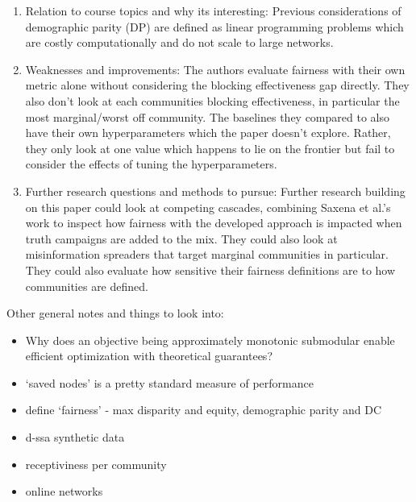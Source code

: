 \documentclass[11pt]{article}
\begin{document}
\begin{enumerate}
    \item Relation to course topics and why its interesting: Previous considerations of demographic parity (DP) are defined as linear programming problems which are costly computationally and do not scale to large networks.

    \item Weaknesses and improvements: The authors evaluate fairness with their own metric alone without considering the blocking effectiveness gap directly. They also don't look at each communities blocking effectiveness, in particular the most marginal/worst off community. The baselines they compared to also have their own hyperparameters which the paper doesn't explore. Rather, they only look at one value which happens to lie on the frontier but fail to consider the effects of tuning the hyperparameters.

    \item Further research questions and methods to pursue: Further research building on this paper could look at competing cascades, combining Saxena et al.'s work to inspect how fairness with the developed approach is impacted when truth campaigns are added to the mix. They could also look at misinformation spreaders that target marginal communities in particular. They could also evaluate how sensitive their fairness definitions are to how communities are defined.

\end{enumerate}

Other general notes and things to look into:

\begin{itemize}
    \item Why does an objective being approximately monotonic submodular enable efficient optimization with theoretical guarantees?

    \item `saved nodes' is a pretty standard measure of performance
    \item define `fairness' - max disparity and equity, demographic parity and DC
    \item d-ssa synthetic data
    \item receptiviness per community
    \item online networks
    
\end{itemize}
\end{document}
